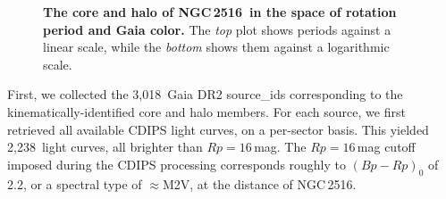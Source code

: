 \documentclass[12pt,twocolumn,tighten]{aastex63}
\newcommand{\cn}{NGC\,2516} %
\newcommand{\nkinematic}{3{,}018\ } %
\newcommand{\ncdips}{2,238\ } %
\begin{document}
\begin{figure}[t]
	\begin{center}
		\leavevmode
	
	\end{center}
	\vspace{-0.7cm}
	\caption{ {\bf The core and halo of \cn\ in the space of rotation
    period and Gaia color.}
    The {\it top} plot shows periods against a linear scale, while the
    {\it bottom}  shows them against a logarithmic scale.
		\label{fig:rot}
	}
\end{figure}

First, we collected the \nkinematic Gaia DR2 source\_ids corresponding to the
kinematically-identified core and halo members.  For each source, we first retrieved all
available CDIPS light curves, on a per-sector basis. 
This yielded
\ncdips light curves, all brighter than $Rp=16$\,mag.
The $Rp=16$\,mag cutoff imposed during the CDIPS processing corresponds
roughly to $(Bp-Rp)_0$ of 2.2, or a spectral type of $\approx$M2V, at
the distance of NGC\,2516.
\end{document}
